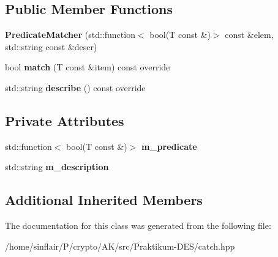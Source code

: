 \subsection*{Public Member Functions}
\begin{DoxyCompactItemize}
\item 
\mbox{\label{classCatch_1_1Matchers_1_1Generic_1_1PredicateMatcher_a57d53ef028c2f7b92b016f627f91aa76}} 
{\bfseries Predicate\+Matcher} (std\+::function$<$ bool(T const \&)$>$ const \&elem, std\+::string const \&descr)
\item 
\mbox{\label{classCatch_1_1Matchers_1_1Generic_1_1PredicateMatcher_a2ec0e8ec19c4c5e26271d59a06a62b52}} 
bool {\bfseries match} (T const \&item) const override
\item 
\mbox{\label{classCatch_1_1Matchers_1_1Generic_1_1PredicateMatcher_af7d59e94892cc09471bbaefac4c889fd}} 
std\+::string {\bfseries describe} () const override
\end{DoxyCompactItemize}
\subsection*{Private Attributes}
\begin{DoxyCompactItemize}
\item 
\mbox{\label{classCatch_1_1Matchers_1_1Generic_1_1PredicateMatcher_ab7f09e9f96fb9d794e1fc699497ec3e0}} 
std\+::function$<$ bool(T const  \&)$>$ {\bfseries m\+\_\+predicate}
\item 
\mbox{\label{classCatch_1_1Matchers_1_1Generic_1_1PredicateMatcher_a7736732e65a93e4e1f889804d043407e}} 
std\+::string {\bfseries m\+\_\+description}
\end{DoxyCompactItemize}
\subsection*{Additional Inherited Members}


The documentation for this class was generated from the following file\+:\begin{DoxyCompactItemize}
\item 
/home/sinflair/\+P/crypto/\+A\+K/src/\+Praktikum-\/\+D\+E\+S/catch.\+hpp\end{DoxyCompactItemize}
